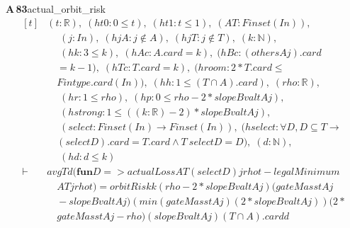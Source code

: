 \documentclass[conference]{IEEEtran}
\theoremstyle{definition}
\newcommand{\lean}[1]{\textsf{\footnotesize #1}}
\begin{document}
\noindent\textbf{A\,83}\quad\lean{actual\_orbit\_risk}
{\footnotesize\[ \begin{aligned}[t]
&(\mathit{t} : \mathbb{R} ),\; (\mathit{ht0} : 0 \leq \mathit{t}),\; (\mathit{ht1} : \mathit{t} \leq 1),\; (\mathit{A} \mathit{T} : \mathit{Finset} (\mathit{I} \mathit{n})),\\
&\quad \; (\mathit{j} : \mathit{I} \mathit{n}),\; (\mathit{hjA} : \mathit{j} \notin \mathit{A}),\; (\mathit{hjT} : \mathit{j} \notin \mathit{T}),\; (\mathit{k} : \mathbb{N} ),\\
&\quad \; (\mathit{hk} : 3 \leq \mathit{k}),\; (\mathit{hAc} : \mathit{A}.\mathit{card}=\mathit{k}),\; (\mathit{hBc} : (\mathit{others} \mathit{A} \mathit{j}).\mathit{card}\\
&\quad =\mathit{k}-1),\; (\mathit{hTc} : \mathit{T}.\mathit{card}=\mathit{k}),\; (\mathit{hroom} : 2*\mathit{T}.\mathit{card} \leq\\
&\quad \mathit{Fintype}.\mathit{card} (\mathit{I} \mathit{n})),\; (\mathit{hh} : 1 \leq (\mathit{T} \cap \mathit{A}).\mathit{card}),\; (\mathit{rho} : \mathbb{R} ),\\
&\quad \; (\mathit{hr} : 1 \leq \mathit{rho}),\; (\mathit{hp} : 0 \leq \mathit{rho}-2*\mathit{slopeBval} \mathit{t} \mathit{A} \mathit{j}),\\
&\quad \; (\mathit{hstrong} : 1 \leq ((\mathit{k}:\mathbb{R} )-2)*\mathit{slopeBval} \mathit{t} \mathit{A} \mathit{j}),\\
&\quad \; (\mathit{select} : \mathit{Finset} (\mathit{I} \mathit{n}) \to \mathit{Finset} (\mathit{I} \mathit{n})),\; (\mathit{hselect} : \forall \mathit{D},\mathit{D} \subseteq \mathit{T} \to\\
&\quad (\mathit{select} \mathit{D}).\mathit{card}=\mathit{T}.\mathit{card} \wedge \mathit{T} \ \mathit{select} \mathit{D}=\mathit{D}),\; (\mathit{d} : \mathbb{N} ),\\
&\quad \; (\mathit{hd} : \mathit{d} \leq \mathit{k})\\
\vdash\;&\mathit{avg} \mathit{T} \mathit{d} (\mathbf{fun} \mathit{D} => \mathit{actualLoss} \mathit{A} \mathit{T} (\mathit{select} \mathit{D}) \mathit{j} \mathit{rho} \mathit{t}-\mathit{legalMinimum}\\
&\quad \mathit{A} \mathit{T} \mathit{j} \mathit{rho} \mathit{t}) = \mathit{orbitRisk} \mathit{k} (\mathit{rho}-2*\mathit{slopeBval} \mathit{t} \mathit{A} \mathit{j}) (\mathit{gateMass} \mathit{t} \mathit{A} \mathit{j}\\
&\quad -\mathit{slopeBval} \mathit{t} \mathit{A} \mathit{j}) (\mathit{min} (\mathit{gateMass} \mathit{t} \mathit{A} \mathit{j}) (2*\mathit{slopeBval} \mathit{t} \mathit{A} \mathit{j})) (2*\\
&\quad \mathit{gateMass} \mathit{t} \mathit{A} \mathit{j}-\mathit{rho}) (\mathit{slopeBval} \mathit{t} \mathit{A} \mathit{j}) (\mathit{T} \cap \mathit{A}).\mathit{card} \mathit{d}
\end{aligned} \]}
\end{document}
